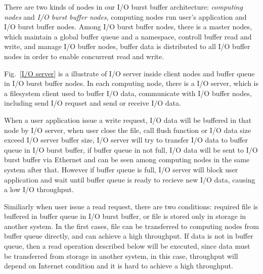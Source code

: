 There are two kinds of nodes in our I/O burst buffer architecture: \emph{computing nodes} and \emph{I/O burst buffer nodes}, computing nodes run user's application and I/O burst buffer nodes.
Among I/O burst buffer nodes, there is a master nodes, which maintain a global buffer queue and a namespace, controll buffer read and write, and manage I/O buffer nodes, buffer data is distributed to all I/O buffer nodes in order to enable concurrent read and write.

Fig.~\ref{I/O server} is a illustrate of I/O server inside client nodes and buffer queue in I/O burst buffer nodes.
In each computing node, there is a I/O server, which is a filesystem client used to buffer I/O data, communicate with I/O buffer nodes, including send I/O requset and send or receive I/O data.

When a user application issue a write request, I/O data will be buffered in that node by I/O server, when user close the file, call flush function or I/O data size exceed I/O server buffer size, I/O server will try to transfer I/O data to buffer queue in I/O burst buffer, if buffer queue in not full, I/O data will be sent to I/O burst buffer via Ethernet and can be seen among computing nodes in the same system after that.
However if buffer queue is full, I/O server will block user application and wait until buffer queue is ready to recieve new I/O data, causing a low I/O throughput.


Similiarly when user issue a read request, there are two conditions: required file is buffered in buffer queue in I/O burst buffer, or file is stored only in storage in another system.
In the first cases, file can be transferred to computing nodes from buffer queue directly, and can achieve a high throughput.
If data is not in buffer queue, then a read operation described below will be executed, since data must be transferred from storage in another system, in this case, throughput will depend on Internet condition and it is hard to achieve a high throughput.

